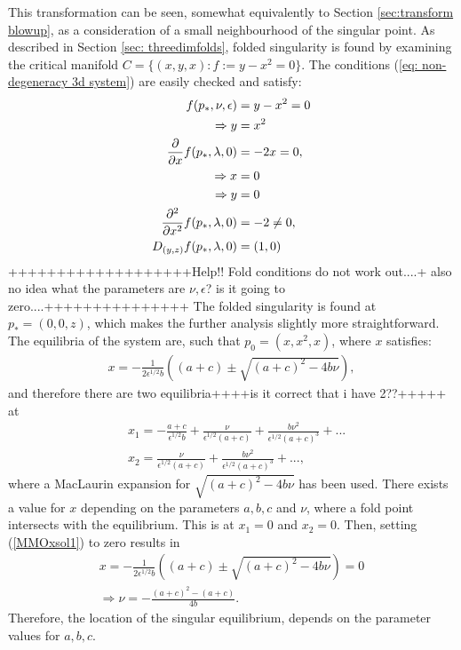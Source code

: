 This transformation can be seen, somewhat equivalently to Section \ref{sec:transform blowup}, as a consideration of a small neighbourhood of the singular point.
As described in Section \ref{sec: threedimfolds}, folded singularity is found by examining the critical manifold $C= \{ (x,y,x) : f:=y-x^2 =0 \}$. The conditions (\ref{eq: non-degeneracy 3d system}) are easily checked and satisfy:
\begin{align*}
f(p_*, \nu, \epsilon)&= y- x^2 =0 \\
\Rightarrow y &= x^2\\
\pd{}{x}f(p_*,\lambda,0) &= -2x = 0,\\
\Rightarrow x &= 0\\
\Rightarrow y &=0\\
\pd{^2}{x^2}f(p_*,\lambda,0) &= -2 \neq 0,\\
D_{(y,z)}f(p_*,\lambda,0) &= (1,0)
\end{align*}
+++++++++++++++++++Help!! Fold conditions do not work out....+ also no idea what the parameters are $\nu, \epsilon$? is it going to zero....+++++++++++++++
The folded singularity is found at $p_*= (0,0,z)$, which makes the further analysis slightly more straightforward.
The equilibria of the system are, such that $p_0= (x,x^2,x)$, where $x$ satisfies:
\begin{align}\label{MMOxsol1}
x = -\frac{1}{2 \epsilon^{1/2} b} \left( (a+c) \pm \sqrt{ (a+c)^2 - 4 b \nu } \right),
\end{align}
and therefore there are two equilibria++++is it correct that i have 2??+++++ at
\begin{align*}
&x_1=-\frac{a+c}{ \epsilon^{1/2} b} + \frac{\nu}{\epsilon^{1/2} (a+c)} + \frac{b \nu^2}{\epsilon^{1/2} (a+c)^3} + ... \\
&x_2= \frac{\nu}{\epsilon^{1/2} (a+c)} + \frac{b \nu^2}{\epsilon^{1/2} (a+c)^3} + ...,
\end{align*}
where a MacLaurin expansion for $\sqrt{ (a+c)^2 - 4 b \nu }$ has been used.
There exists a value for $x$ depending on the parameters $a,b,c$ and $\nu$, where a fold point intersects with the equilibrium. This is at $x_1=0$ and $x_2=0$.
Then, setting (\ref{MMOxsol1}) to zero results in
\begin{align*}
x=-\frac{1}{2 \epsilon^{1/2} b} \left( (a+c) \pm \sqrt{ (a+c)^2 - 4 b \nu } \right)=0\\
\Rightarrow \nu = - \frac{ (a+c)^2 - (a+c)}{4b}.
\end{align*}
Therefore, the location of the singular equilibrium, depends on the parameter values for $a,b,c$.

